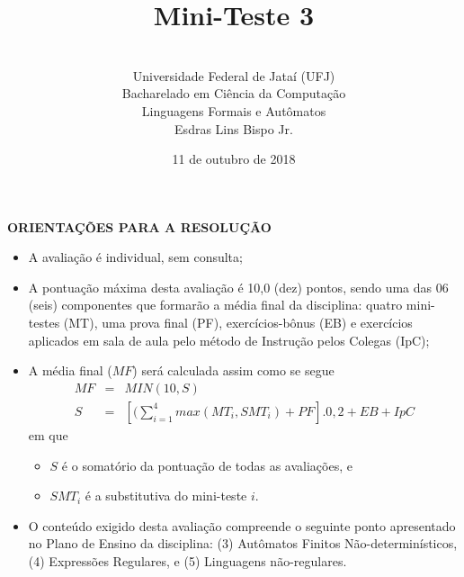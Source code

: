 \documentclass[12pt,a4paper,oneside]{article}
\author{\\Universidade Federal de Jataí (UFJ)\\Bacharelado em Ciência da Computação \\Linguagens Formais e Autômatos \\Esdras Lins Bispo Jr.}
\date{11 de outubro de 2018}
\title{\sc \huge Mini-Teste 3}
\begin{document}
\maketitle

{\bf ORIENTAÇÕES PARA A RESOLUÇÃO}

\small
 
\begin{itemize}
	\item A avaliação é individual, sem consulta;
	\item A pontuação máxima desta avaliação é 10,0 (dez) pontos, sendo uma das 06 (seis) componentes que formarão a média final da disciplina: quatro mini-testes (MT), uma prova final (PF), exercícios-bônus (EB) e exercícios aplicados em sala de aula pelo método de Instrução pelos Colegas (IpC);
	\item A média final ($MF$) será calculada assim como se segue
	\begin{eqnarray}
		MF & = & MIN(10, S) \nonumber \\
		S & = & [(\sum_{i=1}^{4} max(MT_i, SMT_i ) + PF].0,2  + EB + IpC\nonumber
	\end{eqnarray}
	em que 
	\begin{itemize}
		\item $S$ é o somatório da pontuação de todas as avaliações, e
		\item $SMT_i$ é a substitutiva do mini-teste $i$.
	\end{itemize}
	\item O conteúdo exigido desta avaliação compreende o seguinte ponto apresentado no Plano de Ensino da disciplina: (3) Autômatos Finitos Não-determinísticos, (4) Expressões Regulares, e (5) Linguagens não-regulares.
\end{itemize}

\begin{center}
\end{center}

\newpage
\end{document}
